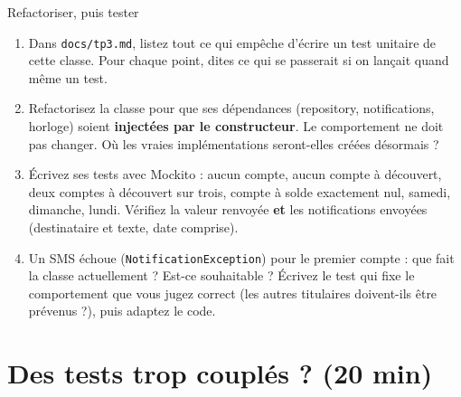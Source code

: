 \documentclass[11pt]{article}
\begin{document}
\begin{exobox}{Refactoriser, puis tester}
\begin{enumerate}[leftmargin=1.4em]
  \item Dans \texttt{docs/tp3.md}, listez tout ce qui empêche d'écrire un test unitaire de cette classe. Pour chaque point, dites ce qui se passerait si on lançait quand même un test.
  \item Refactorisez la classe pour que ses dépendances (repository, notifications, horloge) soient \textbf{injectées par le constructeur}. Le comportement ne doit pas changer. Où les vraies implémentations seront-elles créées désormais ?
  \item Écrivez ses tests avec Mockito : aucun compte, aucun compte à découvert, deux comptes à découvert sur trois, compte à solde exactement nul, samedi, dimanche, lundi. Vérifiez la valeur renvoyée \textbf{et} les notifications envoyées (destinataire et texte, date comprise).
  \item Un SMS échoue (\texttt{NotificationException}) pour le premier compte : que fait la classe actuellement ? Est-ce souhaitable ? Écrivez le test qui fixe le comportement que vous jugez correct (les autres titulaires doivent-ils être prévenus ?), puis adaptez le code.
\end{enumerate}
\end{exobox}

\section{Des tests trop couplés ? (20 min)}
\end{document}
